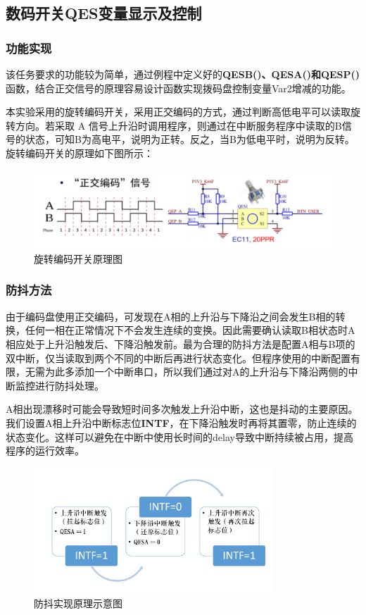 \documentclass[12pt]{article}
\begin{document}
\subsection{数码开关QES变量显示及控制}
\subsubsection{功能实现}

该任务要求的功能较为简单，通过例程中定义好的\textbf{QESB()、QESA()和QESP()}函数，结合正交信号的原理容易设计函数实现拨码盘控制变量Var2增减的功能。

本实验采用的旋转编码开关，采用正交编码的方式，通过判断高低电平可以读取旋转方向。若采取 A 信号上升沿时调用程序，则通过在中断服务程序中读取的B信号的状态，可知B为高电平，说明为正转。反之，当B为低电平时，说明为反转。旋转编码开关的原理如下图所示：
\begin{figure}[htbp]
	\centering
	\includegraphics[width = \textwidth]{graph/pic2.png}
	\caption{旋转编码开关原理图}
\end{figure}

\subsubsection{防抖方法}
由于编码盘使用正交编码，可发现在A相的上升沿与下降沿之间会发生B相的转换，任何一相在正常情况下不会发生连续的变换。因此需要确认读取B相状态时A相应处于上升沿触发后、下降沿触发前。最为合理的防抖方法是配置A相与B项的双中断，仅当读取到两个不同的中断后再进行状态变化。但程序使用的中断配置有限，无需为此多添加一个中断串口，所以我们通过对A的上升沿与下降沿两侧的中断监控进行防抖处理。

A相出现漂移时可能会导致短时间多次触发上升沿中断，这也是抖动的主要原因。我们设置A相上升沿中断标志位\textbf{INTF}，在下降沿触发时再将其置零，防止连续的状态变化。这样可以避免在中断中使用长时间的delay导致中断持续被占用，提高程序的运行效率。

\begin{figure}[htbp]
	\centering
	\includegraphics[width = 0.8\textwidth]{graph/form.png}
	\caption{防抖实现原理示意图}
	\label{pic:prin}
\end{figure}
\end{document}
